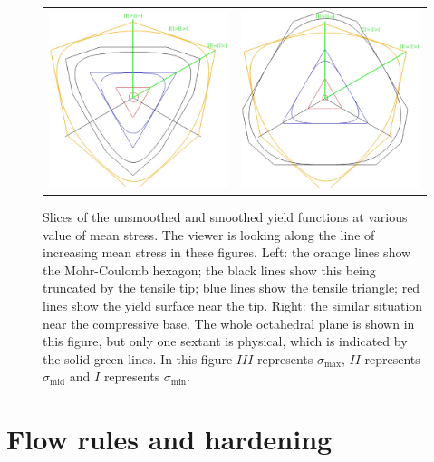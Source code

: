 \documentclass[]{scrreprt}
\newcommand{\smax}{\sigma_{\mathrm{max}}}
\newcommand{\smid}{\sigma_{\mathrm{mid}}}
\newcommand{\smin}{\sigma_{\mathrm{min}}}
\begin{document}
\begin{figure}[htb]
  \begin{center}
    \begin{tabular}{ll}
\includegraphics[width=6cm]{capped_mc_2D_tip.eps} &
\includegraphics[width=6cm]{capped_mc_2D_base.eps}
    \end{tabular}
\caption{Slices of the unsmoothed and smoothed yield functions at
  various value of mean stress.  The viewer is looking along the line
  of increasing mean stress in these figures.  Left: the orange lines show the
  Mohr-Coulomb hexagon; the black lines show this being truncated by
  the tensile tip; blue lines show the tensile triangle; red lines
  show the yield surface near the tip.  Right: the similar situation
  near the compressive base.  The whole octahedral plane is shown in this figure, but
  only one sextant is physical, which is indicated by the solid green
  lines.  In this figure $III$ represents $\smax$, $II$ represents $\smid$ and $I$ represents $\smin$.}
\label{cmc_oct.fig}
\end{center}
\end{figure}


\chapter{Flow rules and hardening}
\end{document}

